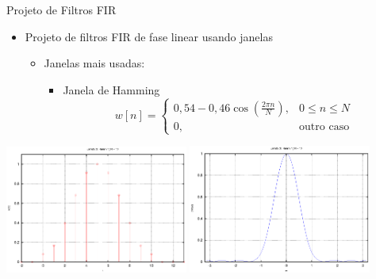 \begin{slide}{Projeto de Filtros FIR}
\begin{itemize}
   \item  Projeto de filtros FIR de fase linear usando janelas 
   \begin{itemize}
      \item Janelas mais usadas:
      \begin{itemize}
         \item Janela de Hamming
         \begin{equation*}
            w[n] = \begin{cases}0,54-0,46\cos\left ( \frac{2\pi n}{N}\right ),&0\leq n\leq N\\ 0,& \text{outro caso}\end{cases}
         \end{equation*}
       \end{itemize}
   \end{itemize}
\end{itemize}
\includegraphics[width=0.45\textwidth]{figs/wn_ham_10.eps}
\includegraphics[width=0.45\textwidth]{figs/w_ham_10.eps}
\end{slide}

